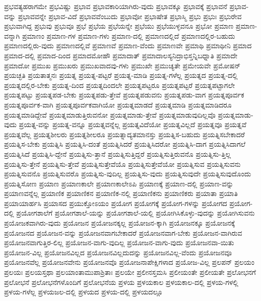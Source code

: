 {ಪ್ರಭವತ್ಯಹರಾಗಮೇ
ಪ್ರಭವಿಷ್ಣು
ಪ್ರಭಾವ
ಪ್ರಭಾವಕಾರಿಯಾಗಿರು-ವುದು
ಪ್ರಭಾವಕ್ಕೂ
ಪ್ರಭಾವಕ್ಕೆ
ಪ್ರಭಾವನೆ
ಪ್ರಭಾವ-ವನ್ನು
ಪ್ರಭಾವವನ್ನೇ
ಪ್ರಭಾವ-ವಿದೆ
ಪ್ರಭಾವವೆಂಬುದು
ಪ್ರಭಾವೋ
ಪ್ರಭಾಷೇತ
ಪ್ರಭಾಸ್ಮಿ
ಪ್ರಭು
ಪ್ರಭುಃ
ಪ್ರಭುರೇವ
ಪ್ರಭುವಾಗಿದ್ದ
ಪ್ರಭುವು
ಪ್ರಭುವೂ
ಪ್ರಭೆ
ಪ್ರಭೆಯ
ಪ್ರಭೆಯನ್ನೇ
ಪ್ರಭೆಯು
ಪ್ರಭೆಯುಳ್ಳವನೂ
ಪ್ರಭೋ
ಪ್ರಮಾಣ
ಪ್ರಮಾಣ-ವನ್ನಾಗಿ
ಪ್ರಮಾಣಂ
ಪ್ರಮಾಣ-ಗಳ
ಪ್ರಮಾಣ-ಗಳು
ಪ್ರಮಾಣ-ದಲ್ಲಿ
ಪ್ರಮಾಣದಲ್ಲಿದೆ
ಪ್ರಮಾಣದಲ್ಲಿರ-ಬಹುದು
ಪ್ರಮಾಣದಲ್ಲಿರು-ವುದು
ಪ್ರಮಾಣದಲ್ಲಿವೆ
ಪ್ರಮಾಣವೆ
ಪ್ರಮಾಣ-ವೆಂದು
ಪ್ರಮಾಣವೇ
ಪ್ರಮಾಥಿ
ಪ್ರಮಾಥೀನಿ
ಪ್ರಮಾದ
ಪ್ರಮಾದ-ದಲ್ಲಿ
ಪ್ರಮಾದ-ದಿಂದ
ಪ್ರಮಾದಮೋಹೌ
ಪ್ರಮಾದಾತ್
ಪ್ರಮಾದಾಲಸ್ಯನಿದ್ರಾಭಿಸ್ತನ್ನಿಬಧ್ನಾತಿ
ಪ್ರಮಾದೇ
ಪ್ರಮಾದೋ
ಪ್ರಮುಖ
ಪ್ರಮುಖರು
ಪ್ರಮುಖವಾದವು-ಗಳು
ಪ್ರಮುಖೇ
ಪ್ರಮುಚ್ಯತೇ
ಪ್ರಮೇಯವೇ
ಪ್ರಮೋಷನ್
ಪ್ರಯಚ್ಛತಿ
ಪ್ರಯತಾತ್ಮನಃ
ಪ್ರಯತ್ನ
ಪ್ರಯತ್ನ-ಪಟ್ಟರೆ
ಪ್ರಯತ್ನ-ಮಾಡಿ
ಪ್ರಯತ್ನ-ಗಳೆಲ್ಲ
ಪ್ರಯತ್ನದ
ಪ್ರಯತ್ನ-ದಲ್ಲಿ
ಪ್ರಯತ್ನದಲ್ಲಿರ-ಬೇಕು
ಪ್ರಯತ್ನ-ದಿಂದ
ಪ್ರಯತ್ನದಿಂದಲೇ
ಪ್ರಯತ್ನಪಟ್ಟರೂ
ಪ್ರಯತ್ನಪಟ್ಟರೆ
ಪ್ರಯತ್ನಪಟ್ಟಾಗಲೇ
ಪ್ರಯತ್ನಪಟ್ಟು
ಪ್ರಯತ್ನಪಡ-ಬೇಕು
ಪ್ರಯತ್ನಪಡು-ತ್ತೇವೆ
ಪ್ರಯತ್ನಪಡುವನು
ಪ್ರಯತ್ನಪಡು-ವಾಗ
ಪ್ರಯತ್ನಪೂರ್ವಕ
ಪ್ರಯತ್ನಪೂರ್ವಕ-ವಾಗಿ
ಪ್ರಯತ್ನಪೂರ್ವಕವಾಗಿಯೋ
ಪ್ರಯತ್ನಮಾಡದೆ
ಪ್ರಯತ್ನಮಾಡಿ
ಪ್ರಯತ್ನಮಾಡಿದರೂ
ಪ್ರಯತ್ನಮಾಡಿದ್ದೇವೆ
ಪ್ರಯತ್ನಮಾಡುತ್ತಿರುವನೋ
ಪ್ರಯತ್ನಮಾಡು-ತ್ತೇವೆ
ಪ್ರಯತ್ನಮಾಡುವುದಿಲ್ಲವೊ
ಪ್ರಯತ್ನಮಾಡು-ವುದು
ಪ್ರಯತ್ನ-ವನ್ನು
ಪ್ರಯತ್ನ-ವನ್ನೂ
ಪ್ರಯತ್ನವನ್ನೆಲ್ಲ
ಪ್ರಯತ್ನವಿದೆಯೋ
ಪ್ರಯತ್ನವಿಲ್ಲದೆ
ಪ್ರಯತ್ನವೂ
ಪ್ರಯತ್ನವೆ
ಪ್ರಯತ್ನವೆಲ್ಲ
ಪ್ರಯತ್ನಶೀಲರು
ಪ್ರಯತ್ನಶೀಲರೂ
ಪ್ರಯತ್ನಾದ್ಯತಮಾನಸ್ತು
ಪ್ರಯತ್ನಿಸ-ಬಹುದು
ಪ್ರಯತ್ನಿಸಬೇಕಾದರೆ
ಪ್ರಯತ್ನಿಸ-ಬೇಕು
ಪ್ರಯತ್ನಿಸಿ
ಪ್ರಯತ್ನಿಸಿ-ದಂತೆ
ಪ್ರಯತ್ನಿಸಿದರೆ
ಪ್ರಯತ್ನಿಸಿದರೋ
ಪ್ರಯತ್ನಿಸಿ-ದಾಗ
ಪ್ರಯತ್ನಿಸಿದಾಗಲೆ
ಪ್ರಯತ್ನಿಸಿದೆ
ಪ್ರಯತ್ನಿಸಿ-ದ್ದೇನೆ
ಪ್ರಯತ್ನಿಸು-ತ್ತಾನೆ
ಪ್ರಯತ್ನಿಸುತ್ತಿದ್ದರೆ
ಪ್ರಯತ್ನಿಸುತ್ತಿರುವನೊ
ಪ್ರಯತ್ನಿಸು-ತ್ತಿಲ್ಲ
ಪ್ರಯತ್ನಿಸು-ತ್ತೇನೆ
ಪ್ರಯತ್ನಿಸು-ತ್ತೇವೆ
ಪ್ರಯತ್ನಿಸುತ್ತೇವೆಯೊ
ಪ್ರಯತ್ನಿಸುತ್ತೇವೆಯೋ
ಪ್ರಯತ್ನಿಸುವ
ಪ್ರಯತ್ನಿಸುವನು
ಪ್ರಯತ್ನಿಸುವನೊ
ಪ್ರಯತ್ನಿಸುವರೊ
ಪ್ರಯತ್ನಿಸು-ವುದಿಲ್ಲ
ಪ್ರಯತ್ನಿಸು-ವುದು
ಪ್ರಯತ್ನಿಸುವುದೇ
ಪ್ರಯತ್ನಿಸುವುದೊಂದು
ಪ್ರಯತ್ನಿಸೋಣ
ಪ್ರಯಾಣ
ಪ್ರಯಾಣಕಾಲೇ
ಪ್ರಯಾಣಕಾಲೇಽಪಿ
ಪ್ರಯಾಣಕ್ಕೆ
ಪ್ರಯಾಣ-ದಲ್ಲಿ
ಪ್ರಯಾಣ-ವನ್ನು
ಪ್ರಯಾಣವನ್ನೆಲ್ಲ
ಪ್ರಯಾಣಿಕ
ಪ್ರಯಾಣಿಕನ
ಪ್ರಯಾಣಿಕ-ನಲ್ಲಿ
ಪ್ರಯಾಣಿಕನು
ಪ್ರಯಾಣಿಕರು
ಪ್ರಯಾತಾ
ಪ್ರಯಾತಿ
ಪ್ರಯಾಯಾರ್ಹಸಿ
ಪ್ರಯಾಸದ
ಪ್ರಯುಕ್ತೋಽಯಂ
ಪ್ರಯೋಗ
ಪ್ರಯೋಗಕ್ಕೆ
ಪ್ರಯೋಗ-ಗಳನ್ನು
ಪ್ರಯೋಗದ
ಪ್ರಯೋಗ-ದಲ್ಲಿ
ಪ್ರಯೋಗಶಾಲೆಗೆ
ಪ್ರಯೋಗಶಾಲೆ-ಯನ್ನು
ಪ್ರಯೋಗಶಾಲೆ-ಯಲ್ಲಿ
ಪ್ರಯೋಗಿಸಿಕೊಳ್ಳು-ವುದನ್ನು
ಪ್ರಯೋಗಿಸುವನು
ಪ್ರಯೋಜಕವಾಗಿರು-ವುದು
ಪ್ರಯೋಜನ
ಪ್ರಯೋಜನಕ್ಕಲ್ಲ
ಪ್ರಯೋಜನ-ಕ್ಕಾಗಿ
ಪ್ರಯೋಜನಕ್ಕೂ
ಪ್ರಯೋಜನಕ್ಕೆ
ಪ್ರಯೋಜನದ
ಪ್ರಯೋಜನ-ವನ್ನು
ಪ್ರಯೋಜನವಾಗಬೇಕಾದರೆ
ಪ್ರಯೋಜನವಾಗ-ಬೇಕು
ಪ್ರಯೋಜನ-ವಾಗಿರುವ
ಪ್ರಯೋಜನವಾಗುತ್ತಿರ-ಲಿಲ್ಲ
ಪ್ರಯೋಜನ-ವಾಗು-ವುದಿಲ್ಲ
ಪ್ರಯೋಜನ-ವಾಗು-ವುದು
ಪ್ರಯೋಜನವಾ-ಯಿತು
ಪ್ರಯೋಜನ-ವಿಲ್ಲ
ಪ್ರಯೋಜನವಿಲ್ಲದ
ಪ್ರಯೋಜನವಿಲ್ಲದುದನ್ನು
ಪ್ರಯೋಜನವಿಲ್ಲ-ವೆಂದು
ಪ್ರಯೋಜನವೂ
ಪ್ರಯೋಜನವೆಲ್ಲ
ಪ್ರಯೋಜನವೇನು
ಪ್ರಯೋಜನವೊ
ಪ್ರಯೋಜನಾಪೇಕ್ಷಿಗಳಾದ
ಪ್ರಯೋಜ-ವಿಲ್ಲ
ಪ್ರಲಪನ್
ಪ್ರಲಯಂ
ಪ್ರಲಯಃ
ಪ್ರಲಯಸ್ತಥಾ
ಪ್ರಲಯಾಂತಾಮುಪಾಶ್ರಿತಾಃ
ಪ್ರಲಯೇ
ಪ್ರಲೀನಸ್ತಮಸಿ
ಪ್ರಲೀಯಂತೇ
ಪ್ರಲೀಯತೇ
ಪ್ರಲೋಭನಗೆ
ಪ್ರಲೋಭನೆ
ಪ್ರಲೋಭನೆಗಳೊಂದಿಗೆ
ಪ್ರಲೋಭನೆಯ
ಪ್ರಳಯ
ಪ್ರಳಯಕಾಲ
ಪ್ರಳಯಕಾಲ-ದಲ್ಲಿ
ಪ್ರಳಯ-ಗಳಲ್ಲಿ
ಪ್ರಳಯ-ಗಳೆಲ್ಲ
ಪ್ರಳಯಜಲ-ದಲ್ಲಿ
ಪ್ರಳಯದ
ಪ್ರಳಯ-ದಲ್ಲಿ
ಪ್ರಳಯದಲ್ಲೂ
}
